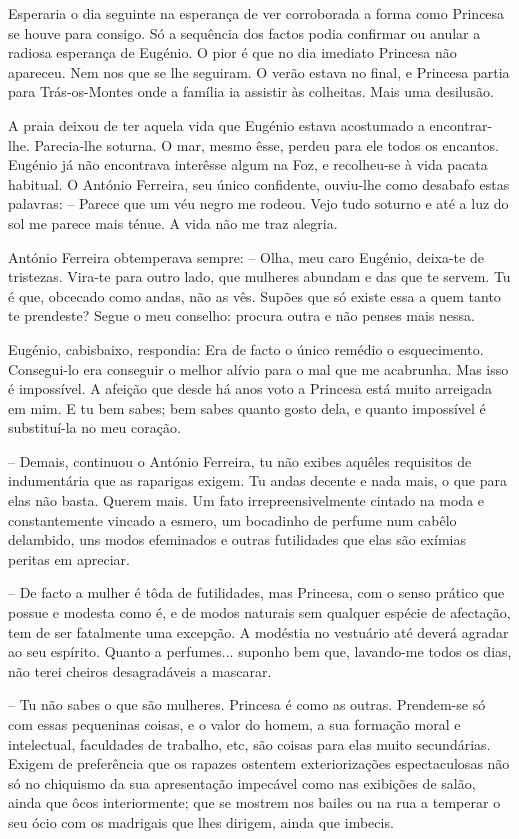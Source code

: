 \documentclass[9pt]{article}
\begin{document}
Esperaria o dia seguinte na esperan\-ça de ver corroborada a forma como Princesa se houve para consigo. Só a sequência dos factos
podia confirmar ou anular a radiosa esperan\-ça de Eugé\-nio. O pior é
que no dia imediato Princesa não apareceu. Nem nos que se lhe seguiram. O verão estava no final, e Princesa partia para Trás-os-Montes
onde a fa\-mí\-lia ia assistir às co\-lheitas. Mais uma desilusão.

A praia deixou de ter aquela vida que Eugé\-nio estava acostumado
a encontrar-\-lhe. Parecia-\-lhe soturna. O mar, mesmo êsse, perdeu para
ele todos os encantos. Eugé\-nio já não encontrava interêsse algum na
Foz, e reco\-lheu-se à vida pacata habitual. O António Ferreira, seu único confidente, ouviu-\-lhe como desabafo estas palavras: -- Parece que
um véu negro me rodeou. Vejo tudo soturno e até a luz do sol me parece mais ténue. A vida não me traz alegria.

António Ferreira obtemperava sempre: -- O\-lha, meu caro Eugé\-nio, deixa-te de tristezas. Vira-te para outro lado, que mu\-lheres abundam e das
que te servem. Tu é que, obcecado como andas, não as vês. Supões que
só existe essa a quem tanto te prendeste? Segue o meu conse\-lho: procura outra e não penses mais nessa.

Eugé\-nio, cabisbaixo, respondia: Era de facto o único remédio o esquecimento. Consegui-lo era conseguir o me\-lhor alívio para o mal que
me acabrunha. Mas isso é impossível. A afei\-ção que desde há anos voto a Princesa está muito arreigada em mim. E tu bem sabes; bem sabes
quanto gosto dela, e quanto impossível é substituí-la no meu cora\-ção.

-- Demais, continuou o António Ferreira, tu não exibes a\-quê\-les requisitos de indumentária que as raparigas exigem. Tu andas decente e
nada mais, o que para elas não basta. Querem mais. Um fato irrepreensivelmente cintado na moda e constantemente vincado a esmero, um bocadinho de perfume num cabêlo delambido, uns modos efeminados e outras
futilidades que elas são exímias peritas em apreciar.

-- De facto a mu\-lher é tôda de futilidades, mas Princesa, com o senso prático que possue e modesta como é, e de modos naturais sem qualquer espécie de afecta\-ção, tem de ser fatalmente uma excep\-ção. A modéstia no vestuário até deverá agradar ao seu espírito. Quanto a perfumes...  suponho bem que, lavando-me todos os dias, não terei cheiros
desagradáveis a mascarar.

-- Tu não sabes o que são mu\-lheres. Princesa é como as outras.
Pren\-dem-se só com essas pequeninas coisas, e o valor do homem, a sua
forma\-ção moral e intelectual, faculdades de traba\-lho, etc,
são coisas para elas muito secundárias. Exigem de preferência que os rapazes ostentem exterioriza\-ções
espectaculosas não só no chiquismo da sua apresenta\-ção impecável como nas exibi\-ções de salão, ainda
que ôcos interiormente; que se mostrem nos bailes ou na rua a temperar o seu ócio com os madrigais que
\-lhes dirigem, ainda que imbecis.
\end{document}
